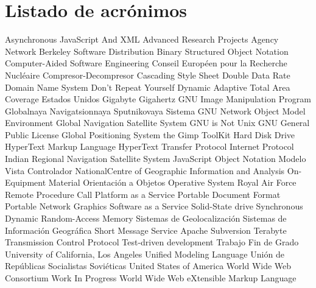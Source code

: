 \chapter{Listado de acrónimos}

\begin{acronym}
	        		{Asynchronous JavaScript And XML}
	        	{Advanced Research Projects Agency Network}
					{Berkeley Software Distribution}
					{Binary Structured Object Notation}
					{Computer-Aided Software Engineering}
	           	{Conseil Européen pour la Recherche Nucléaire}
	          	{Compresor-Decompresor}		  
	            	{Cascading Style Sheet}
	            	{Double Data Rate}
					{Domain Name System}
				  	{Don't Repeat Yourself}
	       	{Dynamic Adaptive Total Area Coverage}
	         	{Estados Unidos}
	             	{Gigabyte}
	            	{Gigahertz}
					{\acs{GNU} Image Manipulation Program}
	        	{Globalnaya Navigatsionnaya Sputnikovaya Sistema}
				{GNU Network Object Model Environment}
	           	{Global Navigation Satellite System}
	            	{\acs{GNU} is Not Unix}
					{\acs{GNU} General Public License}
	            	{Global Positioning System}
					{the Gimp ToolKit}
	            	{Hard Disk Drive}
	           	{HyperText Markup Language}
	           	{HyperText Transfer Protocol}
	             	{Internet Protocol}
	          	{Indian Regional Navigation Satellite System}
					{JavaScript Object Notation}
				   	{Modelo Vista Controlador}
	          	{NationalCentre of Geographic Information and Analysis}
					{On-Equipment Material}
	             	{Orientación a Objetos}
	             	{Operative System}
	            	{Royal Air Force}
	            	{Remote Procedure Call}
					{Platform as a Service}
					{Portable Document Format}
					{Portable Network Graphics}
					{Software as a Service}
	            	{Solid-State drive}
	          	{Synchronous Dynamic Random-Access Memory}
	             	{Sistemas de Geolocalización}
	            	{Sistemas de Información Geográfica}
	            	{Short Message Service}
					{Apache Subversion}
	             	{Terabyte}
	            	{Transmission Control Protocol}
	            	{Test-driven development}
	            	{Trabajo Fin de Grado}
	           	{University of California, Los Angeles}
					{Unified Modeling Language}
	           	{Unión de Repúblicas Socialistas Soviéticas}
	            	{United States of America}
					{World Wide Web Consortium}
	            	{Work In Progress}
	            	{World Wide Web}
					{eXtensible Markup Language}
\end{acronym}



